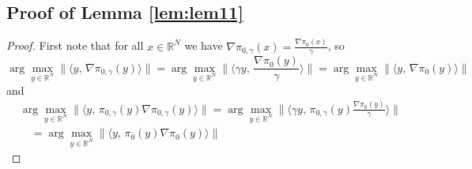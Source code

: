 \documentclass[journal,onecolumn]{IEEEtran}
\newcommand{\grad}{\nabla}
\newcommand{\reals}{\mathbb{R}}
\newcommand{\dimn}{N}
\newcommand{\idistr}{\ids_0}
\newcommand{\ids}{\pi}
\newcommand{\idw}{\gamma}
\newcommand{\isp}{0,\idw}
\newcommand{\idistrw}{\ids_{\isp}}
\begin{document}
{\subsection*{Proof of Lemma \ref{lem:lem11}}
\begin{proof}
First note that for all $x\in \reals^{\dimn}$ we have $\grad\idistrw(x) = \frac{\grad\idistr(x)}{\idw}$, so 
\[\arg\max_{y\in\reals^{\dimn}}\|\langle y,\, \grad \idistrw(y) \rangle\| = \arg\max_{y\in\reals^{\dimn}}\|\langle \idw y,\, \frac{\grad \idistr(y)}{\idw} \rangle\| =  \arg\max_{y\in\reals^{\dimn}}\|\langle y,\, \grad \idistr(y) \rangle\|\]
and
\begin{align*}
    &\arg\max_{y\in\reals^{\dimn}}\|\langle y,\, \idistrw(y)\grad \idistrw(y) \rangle\| = \arg\max_{y\in\reals^{\dimn}}\|\langle \idw y,\, \idistrw(y)\frac{\grad \idistr(y)}{\idw} \rangle\|\\& \quad =  \arg\max_{y\in\reals^{\dimn}}\|\langle y,\, \idistr(y)\grad \idistr(y) \rangle\|
\end{align*}


\end{proof}}
\end{document}
